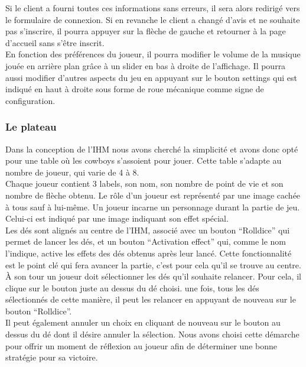 \documentclass[a4paper,11pt]{article}
\begin{document}
\newpage 

Si le client a fourni toutes ces informations sans erreurs, il sera alors redirigé vers le formulaire de connexion. Si en revanche le client a changé d’avis et ne souhaite pas s’inscrire, il pourra appuyer sur la flèche de gauche et retourner à la page d’accueil sans s'être inscrit. \\

En fonction des préférences du joueur, il pourra modifier le volume de la musique jouée en arrière plan grâce à un slider en bas à droite de l’affichage. Il pourra aussi modifier d’autres aspects du jeu en appuyant sur le bouton settings qui est indiqué en haut à droite sous forme de roue mécanique comme signe de configuration.

\subsubsection{Le plateau}

Dans la conception de l'IHM nous avons cherché la simplicité et avons donc opté pour une table où les cowboys s’assoient pour jouer. Cette table s'adapte au nombre de joueur, qui varie de 4 à 8. \\

Chaque joueur contient 3 labels, son nom, son nombre de point de vie et son nombre de flèche obtenu. Le rôle d’un joueur est représenté par une image cachée à tous sauf à lui-même. Un joueur incarne un personnage durant la partie de jeu. Celui-ci est indiqué par une image indiquant son effet spécial. \\

Les dés sont alignés au centre de l'IHM, associé avec un bouton “Rolldice” qui permet de lancer les dés, et un bouton “Activation effect” qui, comme le nom l'indique, active les effets des dés obtenus après leur lancé. Cette fonctionnalité est le point clé qui fera avancer la partie, c’est pour cela qu’il se trouve au centre. \\

À son tour un joueur doit sélectionner les dés qu'il souhaite relancer. Pour cela, il clique sur le bouton juste au dessus du dé choisi. une fois, tous les dés sélectionnés de cette manière, il peut les relancer en appuyant de nouveau sur le bouton “Rolldice”. \\

Il peut également annuler un choix en cliquant de nouveau sur le bouton au dessus du dé dont il désire annuler la sélection. Nous avons choisi cette démarche pour offrir un moment de réflexion au joueur afin de déterminer une bonne stratégie pour sa victoire. \\
\end{document}
